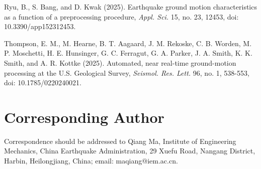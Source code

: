 \documentclass[12pt,letterpaper]{article}
\begin{document}
Ryu, B., S. Bang, and D. Kwak (2025). Earthquake ground motion characteristics as a function of a preprocessing procedure, \emph{Appl. Sci.} 15, no. 23, 12453, doi: 10.3390/app152312453.

Thompson, E. M., M. Hearne, B. T. Aagaard, J. M. Rekoske, C. B. Worden, M. P. Moschetti, H. E. Hunsinger, G. C. Ferragut, G. A. Parker, J. A. Smith, K. K. Smith, and A. R. Kottke (2025). Automated, near real-time ground-motion processing at the U.S. Geological Survey, \emph{Seismol. Res. Lett.} 96, no. 1, 538-553, doi: 10.1785/0220240021.

\section{Corresponding Author}\label{corresponding-author}

Correspondence should be addressed to Qiang Ma, Institute of Engineering Mechanics, China Earthquake Administration, 29 Xuefu Road, Nangang District, Harbin, Heilongjiang, China; email: maqiang@iem.ac.cn.
\end{document}
